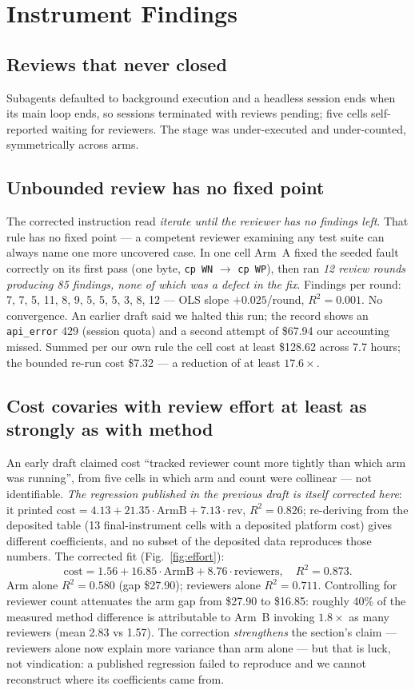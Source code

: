 \documentclass[runningheads]{llncs}
\begin{document}
\section{Instrument Findings}\label{sec:instrument}

\subsection{Reviews that never closed}
Subagents defaulted to background execution and a headless session ends when
its main loop ends, so sessions terminated with reviews pending; five cells
self-reported waiting for reviewers. The stage was under-executed and
under-counted, symmetrically across arms.

\subsection{Unbounded review has no fixed point}
The corrected instruction read \emph{iterate until the reviewer has no
findings left}. That rule has no fixed point --- a competent reviewer
examining any test suite can always name one more uncovered case. In one cell
Arm~A fixed the seeded fault correctly on its first pass (one byte,
\texttt{cp WN} $\rightarrow$ \texttt{cp WP}), then ran \emph{12 review rounds
producing 85 findings, none of which was a defect in the fix}. Findings per
round: 7, 7, 5, 11, 8, 9, 5, 5, 5, 3, 8, 12 --- OLS slope $+0.025$/round,
$R^2=0.001$. No convergence. An earlier draft said we halted this run; the
record shows an \texttt{api\_error} 429 (session quota) and a second attempt
of \$67.94 our accounting missed. Summed per our own rule the cell cost at
least \$128.62 across 7.7 hours; the bounded re-run cost \$7.32 --- a
reduction of at least $17.6\times$.

\subsection{Cost covaries with review effort at least as strongly as with
method}\label{sec:effort}
An early draft claimed cost ``tracked reviewer count more tightly than which
arm was running'', from five cells in which arm and count were collinear ---
not identifiable. \emph{The regression published in the previous draft is
itself corrected here}: it printed $\mathrm{cost}=4.13+21.35\cdot\mathrm{ArmB}
+7.13\cdot\mathrm{rev}$, $R^2=0.826$; re-deriving from the deposited table
(13 final-instrument cells with a deposited platform cost) gives different
coefficients, and no subset of the deposited data reproduces those numbers.
The corrected fit (Fig.~\ref{fig:effort}):
\[
\mathrm{cost} = 1.56 + 16.85\cdot\mathrm{ArmB} + 8.76\cdot\mathrm{reviewers},
\quad R^2 = 0.873.
\]
Arm alone $R^2=0.580$ (gap \$27.90); reviewers alone $R^2=0.711$.
Controlling for reviewer count attenuates the arm gap from \$27.90 to
\$16.85: roughly 40\% of the measured method difference is attributable to
Arm~B invoking $1.8\times$ as many reviewers (mean 2.83 vs 1.57). The
correction \emph{strengthens} the section's claim --- reviewers alone now
explain more variance than arm alone --- but that is luck, not vindication: a
published regression failed to reproduce and we cannot reconstruct where its
coefficients came from.
\end{document}
